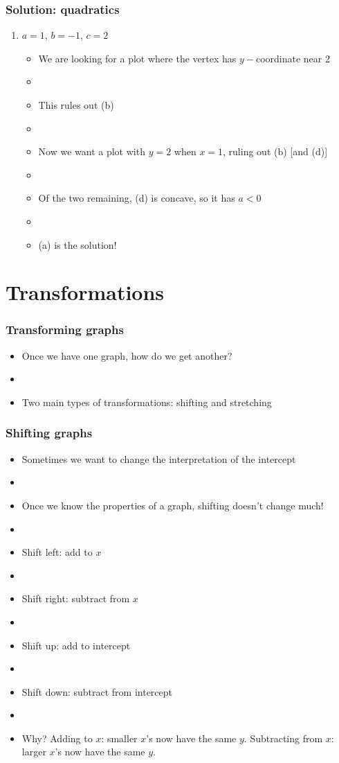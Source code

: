 \documentclass[11pt]{beamer}
\newcommand{\myframe}[1]{\begin{frame} \frametitle{#1}}
\begin{document}
\myframe{Solution: quadratics}
\begin{enumerate}
\item $a = 1$, $b = -1$, $c = 2$
\begin{itemize}
\item We are looking for a plot where the vertex has $y-$coordinate near 2
\item[]
\item This rules out (b)
\item[]
\item Now we want a plot with $y = 2$ when $x = 1$, ruling out (b) [and (d)]
\item[]
\item Of the two remaining, (d) is concave, so it has $a < 0$
\item[]
\item (a) is the solution!
\end{itemize}
\end{enumerate}
\end{frame}

\section{Transformations}
\myframe{Transforming graphs}
\begin{itemize}
\item Once we have one graph, how do we get another?
\item[]
\item Two main types of transformations: shifting and stretching
\end{itemize}
\end{frame}

\myframe{Shifting graphs}
\begin{itemize}
\item Sometimes we want to change the interpretation of the intercept
\item[]
\item Once we know the properties of a graph, shifting doesn't change much!
\item[]
\item Shift left: add to $x$
\item[]
\item Shift right: subtract from $x$
\item[]
\item Shift up: add to intercept
\item[]
\item Shift down: subtract from intercept
\item[]
\item Why? Adding to $x$: smaller $x$'s now have the same $y$. Subtracting from $x$: larger $x$'s now have the same $y$.
\end{itemize}
\end{frame}
\end{document}
